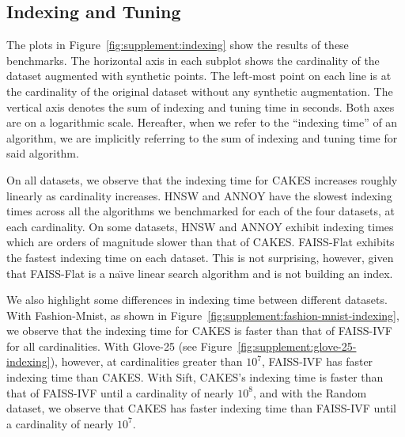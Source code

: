 \documentclass{article}
\begin{document}
\subsection{Indexing and Tuning}

The plots in Figure~\ref{fig:supplement:indexing} show the results of these benchmarks.
The horizontal axis in each subplot shows the cardinality of the dataset augmented with synthetic points.
The left-most point on each line is at the cardinality of the original dataset without any synthetic augmentation.
The vertical axis denotes the sum of indexing and tuning time in seconds.
Both axes are on a logarithmic scale.
Hereafter, when we refer to the ``indexing time'' of an algorithm, we are implicitly referring to the sum of indexing and tuning time for said algorithm.

On all datasets, we observe that the indexing time for CAKES increases roughly linearly as cardinality increases.
HNSW and ANNOY have the slowest indexing times across all the algorithms we benchmarked for each of the four datasets, at each cardinality.
On some datasets, HNSW and ANNOY exhibit indexing times which are orders of magnitude slower than that of CAKES.
FAISS-Flat exhibits the fastest indexing time on each dataset.
This is not surprising, however, given that FAISS-Flat is a na\"{\i}ve linear search algorithm and is not building an index.

We also highlight some differences in indexing time between different datasets.
With Fashion-Mnist, as shown in Figure~\ref{fig:supplement:fashion-mnist-indexing}, we observe that the indexing time for CAKES is faster than that of FAISS-IVF for all cardinalities.
With Glove-25 (see Figure~\ref{fig:supplement:glove-25-indexing}), however, at cardinalities greater than $10^7$, FAISS-IVF has faster indexing time than CAKES.
With Sift, CAKES's indexing time is faster than that of FAISS-IVF until a cardinality of nearly $10^8$, and with the Random dataset, we observe that CAKES has faster indexing time than FAISS-IVF until a cardinality of nearly $10^7$.
\end{document}
